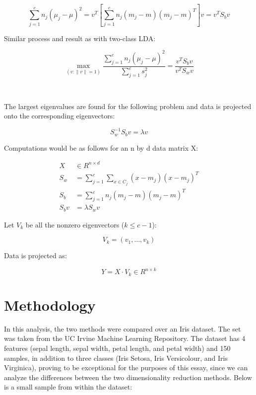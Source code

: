 \documentclass{article}
\begin{document}
\begin{equation*}
\sum_{j=1}^{c} n_j (\mu_j - \mu)^2 = v^T \left[ \sum_{j=1}^{c} n_j (m_j - m)(m_j - m)^T \right] v = v^T S_b v
\end{equation*}

Similar process and result as with two-class LDA:

\begin{equation*}
\max_{(v: \|v\| = 1)} \frac{\sum_{j=1}^{c} n_j (\mu_j - \mu)^2}{\sum_{j=1}^{c} s_j^2} = \frac{v^T S_b v}{v^T S_w v}
\end{equation*}

\

The largest eigenvalues are found for the following problem and data is projected onto the corresponding eigenvectors:

\begin{equation*}
S_w^{-1} S_b v = \lambda v
\end{equation*}

Computations would be as follows for an n by d data matrix X:

\begin{align*}
X &\in R^{n \times d} \\
S_w &= \sum_{j=1}^{c} \sum_{x \in C_j} (x - m_j)(x - m_j)^T \\
S_b &= \sum_{j=1}^{c} n_j (m_j - m)(m_j - m)^T \\
S_b v &= \lambda S_w v
\end{align*}

Let $V_k$ be all the nonzero eigenvectors ($k \leq c - 1$):

\begin{equation*}
V_k = (v_1, \dots , v_k)
\end{equation*}

Data is projected as:

\begin{equation*}
Y = X \cdot V_k \in R^{n \times k}
\end{equation*}

\section{Methodology}

In this analysis, the two methods were compared over an Iris dataset. The set was taken from the UC Irvine Machine Learning Repository. The dataset has 4 features (sepal length, sepal width, petal length, and petal width) and 150 samples, in addition to three classes (Iris Setosa, Iris Versicolour, and Iris Virginica), proving to be exceptional for the purposes of this essay, since we can analyze the differences between the two dimensionality reduction methods. Below is a small sample from within the dataset:
\end{document}
